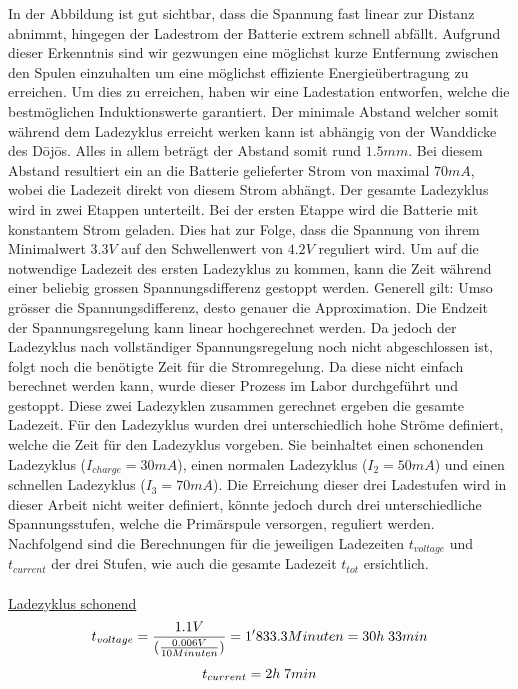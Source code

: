 In der Abbildung ist gut sichtbar, dass die Spannung fast linear zur Distanz abnimmt, hingegen der Ladestrom der Batterie extrem schnell abfällt. Aufgrund dieser Erkenntnis sind wir gezwungen eine möglichst kurze Entfernung zwischen den Spulen einzuhalten um eine möglichst effiziente Energieübertragung zu erreichen. Um dies zu erreichen, haben wir eine Ladestation entworfen, welche die bestmöglichen Induktionswerte garantiert. Der minimale Abstand welcher somit während dem Ladezyklus erreicht werken kann ist abhängig von der Wanddicke des Dōjōs. Alles in allem beträgt der Abstand somit rund $1.5mm$. Bei diesem Abstand resultiert ein an die Batterie gelieferter Strom von maximal $70mA$, wobei die Ladezeit direkt von diesem Strom abhängt. Der gesamte Ladezyklus wird in zwei Etappen unterteilt. Bei der ersten Etappe wird die Batterie mit konstantem Strom geladen. Dies hat zur Folge, dass die Spannung von ihrem Minimalwert $3.3V$ auf den Schwellenwert von $4.2V$ reguliert wird. Um auf die notwendige Ladezeit des ersten Ladezyklus zu kommen, kann die Zeit während einer beliebig grossen Spannungsdifferenz gestoppt werden. Generell gilt: Umso grösser die Spannungsdifferenz, desto genauer die Approximation. Die Endzeit der Spannungsregelung kann linear hochgerechnet werden. Da jedoch der Ladezyklus nach vollständiger Spannungsregelung noch nicht abgeschlossen ist, folgt noch die benötigte Zeit für die Stromregelung. Da diese nicht einfach berechnet werden kann, wurde dieser Prozess im Labor durchgeführt und gestoppt. Diese zwei Ladezyklen zusammen gerechnet ergeben die gesamte Ladezeit. Für den Ladezyklus wurden drei unterschiedlich hohe Ströme definiert, welche die Zeit für den Ladezyklus vorgeben. Sie beinhaltet einen schonenden Ladezyklus ($I_{charge}=30mA$), einen normalen Ladezyklus ($I_{2}=50mA$) und einen schnellen Ladezyklus ($I_{3}=70mA$). Die Erreichung dieser drei Ladestufen wird in dieser Arbeit nicht weiter definiert, könnte jedoch durch drei unterschiedliche Spannungsstufen, welche die Primärspule versorgen, reguliert werden. Nachfolgend sind die Berechnungen für die jeweiligen Ladezeiten $t_{voltage}$ und $t_{current}$ der drei Stufen, wie auch die gesamte Ladezeit $t_{tot}$ ersichtlich.
\\
\\

\underline{Ladezyklus schonend}
\begin{equation}
\centering
t_{voltage}=\frac{1.1 V}{(\frac{0.006 V}{10 Minuten})}=1'833.3 Minuten= 30h\thickspace 33min
\label{eq:SchonendSpannung}
\end{equation}
\begin{equation}
\centering
t_{current}= 2h\thickspace 7min
\label{eq:SchonendStrom}
\end{equation}

